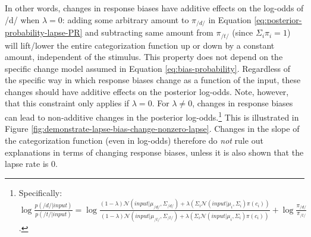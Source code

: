 \documentclass[
  11pt,
  english,
  man,floatsintext]{apa6}
\begin{document}
In other words, changes in response biases have additive effects on the log-odds of /d/ when \(\lambda = 0\): adding some arbitrary amount to \(\pi_{/d/}\) in Equation \eqref{eq:posterior-probability-lapse-PR} and subtracting same amount from \(\pi_{/t/}\) (since \(\Sigma_i \pi_i = 1\)) will lift/lower the entire categorization function up or down by a constant amount, independent of the stimulus. This property does not depend on the specific change model assumed in Equation \eqref{eq:bias-probability}. Regardless of the specific way in which response biases change as a function of the input, these changes should have additive effects on the posterior log-odds.
Note, however, that this constraint only applies if \(\lambda = 0\). For \(\lambda \neq 0\), changes in response biases can lead to non-additive changes in the posterior log-odds.\footnote{Specifically: \(\log \frac{p(/d/ | input)}{p(/t/ | input)} = \log \frac{(1-\lambda)\mathcal{N}\!\left( input | \mu_{/d/}, \Sigma_{/d/} \right) + \lambda \left(\Sigma_i \mathcal{N}\!\left( input | \mu_{i}, \Sigma_{i} \right)\pi(c_i)\right)}{(1-\lambda)\mathcal{N}\!\left( input | \mu_{/t/}, \Sigma_{/t/} \right) + \lambda \left(\Sigma_i \mathcal{N}\!\left( input | \mu_{i}, \Sigma_{i} \right)\pi(c_i)\right)} + \log\frac{\pi_{/d/}}{\pi_{/t/}}\).} This is illustrated in Figure \ref{fig:demonstrate-lapse-bias-change-nonzero-lapse}. Changes in the slope of the categorization function (even in log-odds) therefore do \emph{not} rule out explanations in terms of changing response biases, unless it is also shown that the lapse rate is 0.
\end{document}
